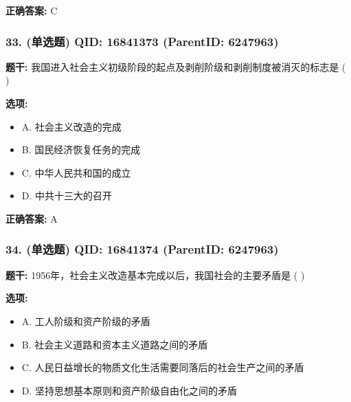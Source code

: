 \documentclass[12pt,UTF8]{ctexart}
\begin{document}
\textbf{正确答案:}
C

\vspace{0.3em}\hrulefill\vspace{0.7em}

\subsubsection*{33. (单选题) \small QID: 16841373 (ParentID: 6247963)}

\textbf{题干:}
我国进入社会主义初级阶段的起点及剥削阶级和剥削制度被消灭的标志是 ( )



\textbf{选项:}
\begin{itemize}[leftmargin=*]

  \item A. 社会主义改造的完成

  \item B. 国民经济恢复任务的完成

  \item C. 中华人民共和国的成立

  \item D. 中共十三大的召开

\end{itemize}

\textbf{正确答案:}
A

\vspace{0.3em}\hrulefill\vspace{0.7em}

\subsubsection*{34. (单选题) \small QID: 16841374 (ParentID: 6247963)}

\textbf{题干:}
1956年，社会主义改造基本完成以后，我国社会的主要矛盾是 ( )



\textbf{选项:}
\begin{itemize}[leftmargin=*]

  \item A. 工人阶级和资产阶级的矛盾

  \item B. 社会主义道路和资本主义道路之间的矛盾

  \item C. 人民日益增长的物质文化生活需要同落后的社会生产之间的矛盾

  \item D. 坚持思想基本原则和资产阶级自由化之间的矛盾

\end{itemize}
\end{document}
